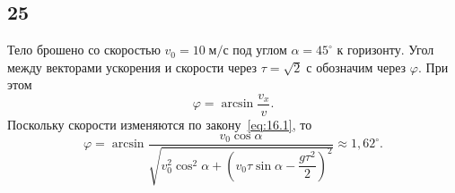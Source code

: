 \subsection{25}

Тело брошено со скоростью $v_0=10\;\text{м/с}$ под углом $\alpha=45^\circ$ к горизонту. Угол между векторами ускорения и скорости через $\tau=\sqrt{2}\;\text{с}$ обозначим через $\varphi$. При этом
\[
\varphi=\arcsin\frac{v_x}{v}.
\]
Поскольку скорости изменяются по закону~\eqref{eq:16.1}, то
\[
\varphi=\arcsin\frac{v_0\cos\alpha}{\sqrt{v_0^2\cos^2\alpha+\left(v_0\tau\sin\alpha-\dfrac{g\tau^2}{2}\right)^2}}\approx1{,}62^\circ.
\]